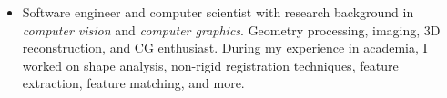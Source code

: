 


\begin{itemize}
	\item Software engineer and computer scientist with research background in 
\textit{computer vision} and \textit{computer graphics}. Geometry processing, imaging, 3D
reconstruction, and CG enthusiast. During my experience in academia, I worked
on shape analysis, non-rigid registration techniques, feature extraction, feature matching, and more.
\end{itemize}
